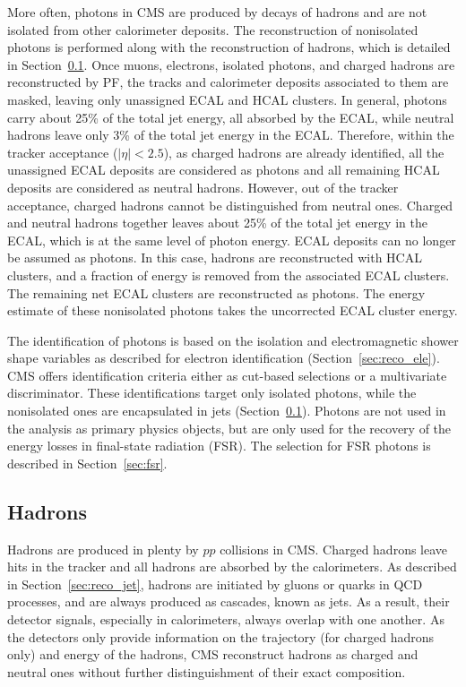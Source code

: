 More often, photons in CMS are produced by decays of hadrons 
and are not isolated from other calorimeter deposits.
The reconstruction of nonisolated photons is performed along with the reconstruction of hadrons, 
which is detailed in Section~\ref{sec:reco_had}.
Once muons, electrons, isolated photons, and charged hadrons are reconstructed by PF, 
the tracks and calorimeter deposits associated to them are masked,
leaving only unassigned ECAL and HCAL clusters.
In general, photons carry about 25\% of the total jet energy, all absorbed by the ECAL,
while neutral hadrons leave only 3\% of the total jet energy in the ECAL.
Therefore, within the tracker acceptance ($|\eta| < 2.5$), as charged hadrons are already identified,
all the unassigned ECAL deposits are considered as photons and all remaining HCAL deposits are considered as neutral hadrons.  
However, out of the tracker acceptance, charged hadrons cannot be distinguished from neutral ones.
Charged and neutral hadrons together leaves about 25\% of the total jet energy in the ECAL,
which is at the same level of photon energy.
ECAL deposits can no longer be assumed as photons.
In this case, hadrons are reconstructed with HCAL clusters, 
and a fraction of energy is removed from the associated ECAL clusters.
The remaining net ECAL clusters are reconstructed as photons.
The energy estimate of these nonisolated photons takes the uncorrected ECAL cluster energy. 

The identification of photons is based on the isolation and electromagnetic shower shape variables as described for electron identification (Section~\ref{sec:reco_ele}).
CMS offers identification criteria either as cut-based selections or a multivariate discriminator.
These identifications target only isolated photons, while the nonisolated ones are encapsulated in jets (Section~\ref{sec:reco_had}).
Photons are not used in the \hmm analysis as primary physics objects, but are only used for the recovery of the energy losses in final-state radiation (FSR).
The selection for FSR photons is described in Section~\ref{sec:fsr}. 

\subsection{Hadrons}\label{sec:reco_had}

Hadrons are produced in plenty by $pp$ collisions in CMS.
Charged hadrons leave hits in the tracker and all hadrons are absorbed by the calorimeters.
As described in Section~\ref{sec:reco_jet}, hadrons are initiated by gluons or quarks in QCD processes, and are always produced as cascades, known as jets.
As a result, their detector signals, especially in calorimeters, always overlap with one another.
As the detectors only provide information on the trajectory (for charged hadrons only) and energy of the hadrons,
CMS reconstruct hadrons as charged and neutral ones without further distinguishment of their exact composition.

